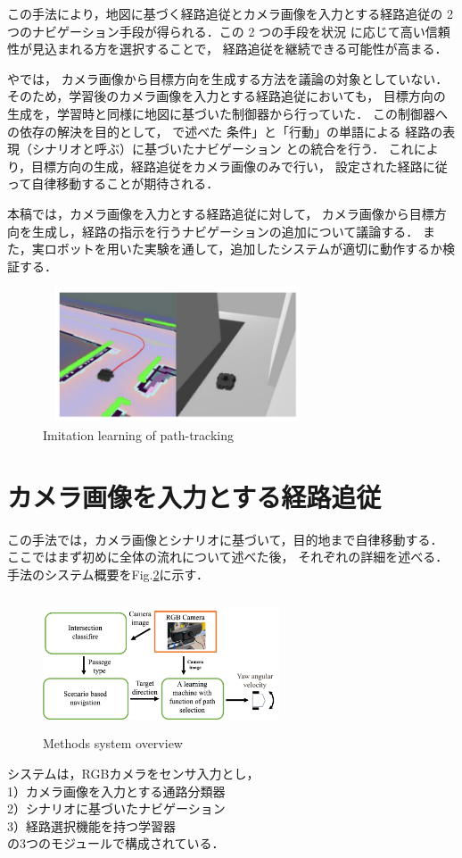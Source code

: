 \documentclass{sice-si}
\begin{document}
この手法により，地図に基づく経路追従とカメラ画像を入力とする経路追従の
2 つのナビゲーション手段が得られる．この 2 つの手段を状況
に応じて高い信頼性が見込まれる方を選択することで，
経路追従を継続できる可能性が高まる．\par
\cite{haruyama2022}や\cite{fujiwara2023}では，
カメラ画像から目標方向を生成する方法を議論の対象としていない．
そのため，学習後のカメラ画像を入力とする経路追従においても，
目標方向の生成を，学習時と同様に地図に基づいた制御器から行っていた．
この制御器への依存の解決を目的として，
\cite{haruyama2022}\cite{fujiwara2023}で述べた
条件」と「行動」の単語による
経路の表現（シナリオと呼ぶ）に基づいたナビゲーション
\cite{shimada2020}
との統合を行う．
これにより，目標方向の生成，経路追従をカメラ画像のみで行い，
設定された経路に従って自律移動することが期待される．
\par
本稿では，カメラ画像を入力とする経路追従に対して，
カメラ画像から目標方向を生成し，経路の指示を行うナビゲーションの追加について議論する．
また，実ロボットを用いた実験を通して，追加したシステムが適切に動作するか検証する．
\begin{figure}[htbp]
    \centering
     \includegraphics[height=40mm,width=80mm]{./figs/map_base.png}
     \caption{Imitation learning of path-tracking}\label{fig:mapbase}
\end{figure}

\section{カメラ画像を入力とする経路追従}
この手法では，カメラ画像とシナリオに基づいて，目的地まで自律移動する．
ここではまず初めに全体の流れについて述べた後，
それぞれの詳細を述べる．
手法のシステム概要をFig.\ref{fig:system}に示す．
\begin{figure}[h!]
    \centering
     \includegraphics[height=40mm,width=70mm]{./figs/system_gai.png}
     \caption{Methods system overview}\label{fig:system}
\end{figure}
\par
システムは，RGBカメラをセンサ入力とし，\\
1）カメラ画像を入力とする通路分類器\\
2）シナリオに基づいたナビゲーション\\
3）経路選択機能を持つ学習器\\
の3つのモジュールで構成されている．
\end{document}
